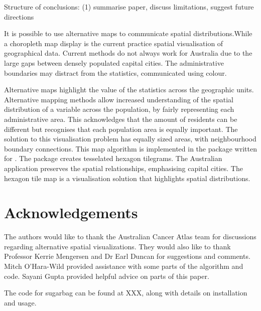 \documentclass[
]{jss}
\begin{document}
Structure of conclusions: (1) summarise paper, discuss limitations,
suggest future directions

It is possible to use alternative maps to communicate spatial
distributions.While a choropleth map display is the current practice
spatial visualisation of geographical data. Current methods do not
always work for Australia due to the large gaps between densely
populated capital cities. The administrative boundaries may distract
from the statistics, communicated using colour.

Alternative maps highlight the value of the statistics across the
geographic units. Alternative mapping methods allow increased
understanding of the spatial distribution of a variable across the
population, by fairly representing each administrative area. This
acknowledges that the amount of residents can be different but
recognises that each population area is equally important. The solution
to this visualisation problem has equally sized areas, with
neighbourhood boundary connections. This map algorithm is implemented in
the \citet{sugarbag} package written for \citet{R}. The 
package creates tesselated hexagon tilegrams. The Australian application
preserves the spatial relationships, emphasising capital cities. The
hexagon tile map is a visualisation solution that highlights spatial
distributions.

\hypertarget{acknowledgements}{%
\section{Acknowledgements}\label{acknowledgements}}

The authors would like to thank the Australian Cancer Atlas team for
discussions regarding alternative spatial visualizations. They would
also like to thank Professor Kerrie Mengersen and Dr Earl Duncan for
suggestions and comments. Mitch O'Hara-Wild provided assistance with
some parts of the algorithm and code. Sayani Gupta provided helpful
advice on parts of this paper.

The code for sugarbag can be found at XXX, along with details on
installation and usage.


\end{document}
